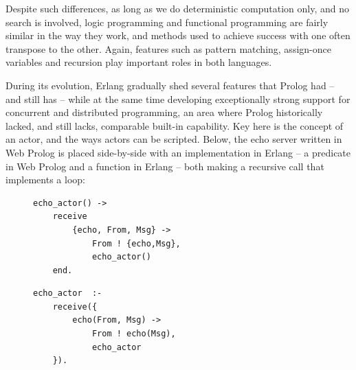 Despite such differences, as long as we do deterministic computation only, and no search is involved, logic programming and functional programming are fairly similar in the way they work, and methods used to achieve success with one often transpose to the other. Again, features such as pattern matching, assign-once variables and recursion play important roles in both languages.

During its evolution, Erlang gradually shed several features that Prolog had -- and still has -- while at the same time developing exceptionally strong support for concurrent and distributed programming, an area where Prolog historically lacked, and still lacks, comparable built-in capability. Key here is the concept of an actor, and the ways actors can be scripted. Below, the echo server written in Web Prolog is placed side-by-side with an implementation in Erlang -- a predicate in Web Prolog and a function in Erlang -- both making a recursive call that implements a loop: 

\begin{figure}[h]
\begin{minipage}{0.485\linewidth}
\begin{tcolorbox}[
  colback=white,
  colframe=black,
  arc=0pt,
  outer arc=0pt,
  boxrule=0.4pt,
  left=2mm,right=2mm,top=1mm,bottom=1mm,
  enhanced
]
\begin{verbatim}
echo_actor() ->           
    receive                
        {echo, From, Msg} ->
            From ! {echo,Msg},
            echo_actor()  
    end. 
\end{verbatim}
\end{tcolorbox}
\end{minipage}
\hfill
\begin{minipage}{0.485\linewidth}
\begin{tcolorbox}[
  colback=white,
  colframe=black,
  arc=0pt,
  outer arc=0pt,
  boxrule=0.4pt,
  left=2mm,right=2mm,top=1mm,bottom=1mm,
  enhanced
]
\begin{verbatim}
echo_actor  :-           
    receive({               
        echo(From, Msg) ->  
            From ! echo(Msg),
            echo_actor     
    }).                          
\end{verbatim}
\end{tcolorbox}
\end{minipage}
\end{figure}


